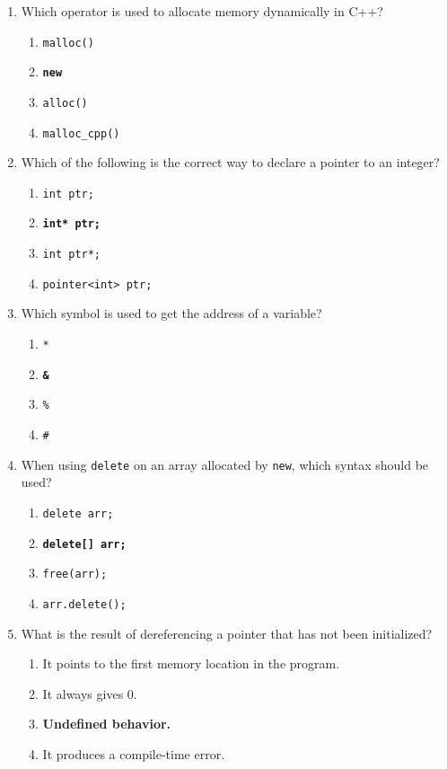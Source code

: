 \documentclass[a4paper,12pt]{article}
\begin{document}
\begin{enumerate}
    \item Which operator is used to allocate memory dynamically in C++?
    \begin{enumerate}
        \item \texttt{malloc()}
        \item \textbf{\texttt{new}}
        \item \texttt{alloc()}
        \item \texttt{malloc\_cpp()}
    \end{enumerate}

    \item Which of the following is the correct way to declare a pointer to an integer?
    \begin{enumerate}
        \item \texttt{int ptr;}
        \item \textbf{\texttt{int* ptr;}}
        \item \texttt{int ptr*;}
        \item \texttt{pointer<int> ptr;}
    \end{enumerate}

    \item Which symbol is used to get the address of a variable?
    \begin{enumerate}
        \item \texttt{*}
        \item \textbf{\texttt{\&}}
        \item \texttt{\%}
        \item \texttt{\#}
    \end{enumerate}

    \item When using \texttt{delete} on an array allocated by \texttt{new}, which syntax should be used?
    \begin{enumerate}
        \item \texttt{delete arr;}
        \item \textbf{\texttt{delete[] arr;}}
        \item \texttt{free(arr);}
        \item \texttt{arr.delete();}
    \end{enumerate}

    \item What is the result of dereferencing a pointer that has not been initialized?
    \begin{enumerate}
        \item It points to the first memory location in the program.
        \item It always gives 0.
        \item \textbf{Undefined behavior.}
        \item It produces a compile-time error.
    \end{enumerate}


\end{enumerate}
\end{document}

